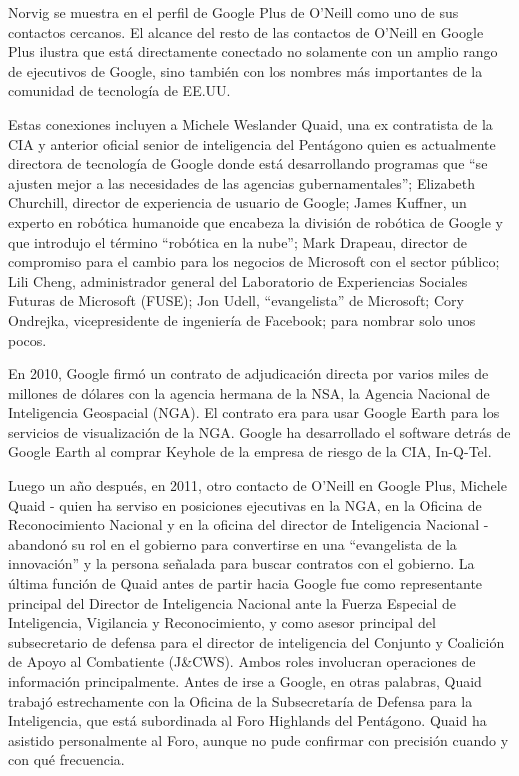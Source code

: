 \documentclass[10pt,a5paper,twoside,spanish,]{book}
\begin{document}
Norvig se muestra en el perfil de Google Plus de O'Neill como uno de sus
contactos cercanos. El alcance del resto de las contactos de O'Neill en
Google Plus ilustra que está directamente conectado no solamente con un
amplio rango de ejecutivos de Google, sino también con los nombres más
importantes de la comunidad de tecnología de EE.UU.

Estas conexiones incluyen a Michele Weslander Quaid, una ex contratista
de la CIA y anterior oficial senior de inteligencia del Pentágono quien
es actualmente directora de tecnología de Google donde está
desarrollando programas que ``se ajusten mejor a las necesidades de las
agencias gubernamentales''; Elizabeth Churchill, director de experiencia
de usuario de Google; James Kuffner, un experto en robótica humanoide
que encabeza la división de robótica de Google y que introdujo el
término ``robótica en la nube''; Mark Drapeau, director de compromiso
para el cambio para los negocios de Microsoft con el sector público;
Lili Cheng, administrador general del Laboratorio de Experiencias
Sociales Futuras de Microsoft (FUSE); Jon Udell, ``evangelista'' de
Microsoft; Cory Ondrejka, vicepresidente de ingeniería de Facebook; para
nombrar solo unos pocos.

En 2010, Google firmó un contrato de adjudicación directa por varios
miles de millones de dólares con la agencia hermana de la NSA, la
Agencia Nacional de Inteligencia Geospacial (NGA). El contrato era para
usar Google Earth para los servicios de visualización de la NGA. Google
ha desarrollado el software detrás de Google Earth al comprar Keyhole de
la empresa de riesgo de la CIA, In-Q-Tel.

Luego un año después, en 2011, otro contacto de O'Neill en Google Plus,
Michele Quaid - quien ha serviso en posiciones ejecutivas en la NGA, en
la Oficina de Reconocimiento Nacional y en la oficina del director de
Inteligencia Nacional - abandonó su rol en el gobierno para convertirse
en una ``evangelista de la innovación'' y la persona señalada para
buscar contratos con el gobierno. La última función de Quaid antes de
partir hacia Google fue como representante principal del Director de
Inteligencia Nacional ante la Fuerza Especial de Inteligencia,
Vigilancia y Reconocimiento, y como asesor principal del subsecretario
de defensa para el director de inteligencia del Conjunto y Coalición de
Apoyo al Combatiente (J\&CWS). Ambos roles involucran operaciones de
información principalmente. Antes de irse a Google, en otras palabras,
Quaid trabajó estrechamente con la Oficina de la Subsecretaría de
Defensa para la Inteligencia, que está subordinada al Foro Highlands del
Pentágono. Quaid ha asistido personalmente al Foro, aunque no pude
confirmar con precisión cuando y con qué frecuencia.
\end{document}
